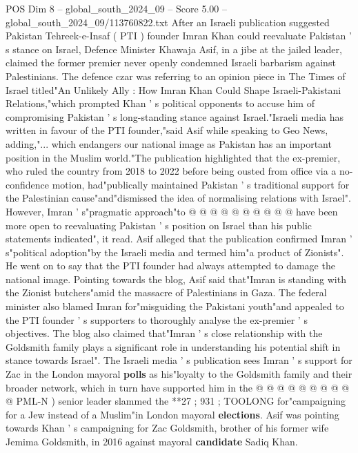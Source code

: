 \begin{textsample}{POS Dim 8 – global\_south\_2024\_09 – Score 5.00 – global\_south\_2024\_09/113760822.txt}  \label{ex:f8_pos_257}
After an Israeli publication suggested Pakistan Tehreek-e-Insaf ( PTI ) founder Imran Khan could reevaluate Pakistan ' s stance on Israel, Defence Minister Khawaja Asif, in a jibe at the jailed leader, claimed the former premier never openly condemned Israeli barbarism against Palestinians.
The defence czar was referring to an opinion piece in The Times of Israel titled"An Unlikely Ally : How Imran Khan Could Shape Israeli-Pakistani Relations,"which prompted Khan ' s political opponents to accuse him of compromising Pakistan ' s long-standing stance against Israel."Israeli media has written in favour of the PTI founder,"said Asif while speaking to Geo News, adding,"... which endangers our national image as Pakistan has an important position in the Muslim world."The publication highlighted that the ex-premier, who ruled the country from 2018 to 2022 before being ousted from office via a no-confidence motion, had"publically maintained Pakistan ' s traditional support for the Palestinian cause"and"dismissed the idea of normalising relations with Israel".
However, Imran ' s"pragmatic approach"to @ @ @ @ @ @ @ @ @ @ have been more open to reevaluating Pakistan ' s position on Israel than his public statements indicated", it read.
Asif alleged that the publication confirmed Imran ' s"political adoption"by the Israeli media and termed him"a product of Zionists".
He went on to say that the PTI founder had always attempted to damage the national image.
Pointing towards the blog, Asif said that"Imran is standing with the Zionist butchers"amid the massacre of Palestinians in Gaza.
The federal minister also blamed Imran for"misguiding the Pakistani youth"and appealed to the PTI founder ' s supporters to thoroughly analyse the ex-premier ' s objectives.
The blog also claimed that"Imran ' s close relationship with the Goldsmith family plays a significant role in understanding his potential shift in stance towards Israel".
The Israeli media ' s publication sees Imran ' s support for Zac in the London mayoral \textbf{polls} as his"loyalty to the Goldsmith family and their broader network, which in turn have supported him in the @ @ @ @ @ @ @ @ @ @ PML-N ) senior leader slammed the **27 ; 931 ; TOOLONG for"campaigning for a Jew instead of a Muslim"in London mayoral \textbf{elections}.
Asif was pointing towards Khan ' s campaigning for Zac Goldsmith, brother of his former wife Jemima Goldsmith, in 2016 against mayoral \textbf{candidate} Sadiq Khan.

\end{textsample}
